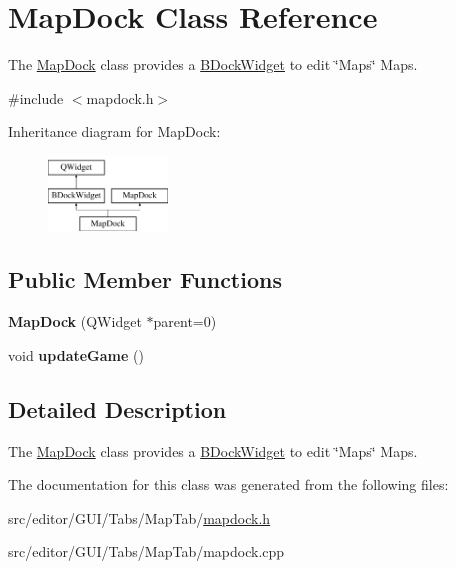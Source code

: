 \hypertarget{class_map_dock}{\section{\-Map\-Dock \-Class \-Reference}
\label{class_map_dock}
}


\-The \hyperlink{class_map_dock}{\-Map\-Dock} class provides a \hyperlink{class_b_dock_widget}{\-B\-Dock\-Widget} to edit \char`\"{}\-Maps\char`\"{} \-Maps.  




{\ttfamily \#include $<$mapdock.\-h$>$}

\-Inheritance diagram for \-Map\-Dock\-:\begin{figure}[H]
\begin{center}
\leavevmode
\includegraphics[height=2.000000cm]{class_map_dock}
\end{center}
\end{figure}
\subsection*{\-Public \-Member \-Functions}
\begin{DoxyCompactItemize}
\item 
\hypertarget{class_map_dock_ae65c5f2f8531ec69a9289c8d4731226e}{{\bfseries \-Map\-Dock} (\-Q\-Widget $\ast$parent=0)}\label{class_map_dock_ae65c5f2f8531ec69a9289c8d4731226e}

\item 
\hypertarget{class_map_dock_a4913eb300e5dd170e9b6c16799731db3}{void {\bfseries update\-Game} ()}\label{class_map_dock_a4913eb300e5dd170e9b6c16799731db3}

\end{DoxyCompactItemize}


\subsection{\-Detailed \-Description}
\-The \hyperlink{class_map_dock}{\-Map\-Dock} class provides a \hyperlink{class_b_dock_widget}{\-B\-Dock\-Widget} to edit \char`\"{}\-Maps\char`\"{} \-Maps. 

\-The documentation for this class was generated from the following files\-:\begin{DoxyCompactItemize}
\item 
src/editor/\-G\-U\-I/\-Tabs/\-Map\-Tab/\hyperlink{mapdock_8h}{mapdock.\-h}\item 
src/editor/\-G\-U\-I/\-Tabs/\-Map\-Tab/mapdock.\-cpp\end{DoxyCompactItemize}
